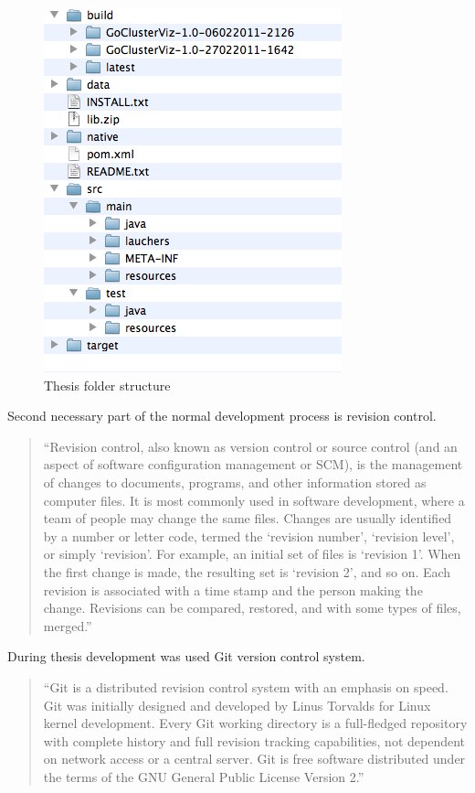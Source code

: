 \begin{figure}[h!]
\centering
\includegraphics[scale=0.6]{pictures/thesis_folder_structure.png}
\caption{Thesis folder structure}
\label{fig:THESIS_FOLDER_STRUCTURE}
\end{figure}

Second necessary part of the normal development process is revision control.

\begin{quotation}
``Revision control, also known as version control or source control (and an aspect of software configuration management or SCM),
is the management of changes to documents, programs, and other information stored as computer files.
It is most commonly used in software development, where a team of people may change the same files.
Changes are usually identified by a number or letter code, termed the `revision number', `revision level', or simply `revision'.
For example, an initial set of files is `revision 1'. When the first change is made, the resulting set is `revision 2', and so on.
Each revision is associated with a time stamp and the person making the change. Revisions can be compared,
restored, and with some types of files, merged.''~\cite{REVISION_CONTROL}
\end{quotation}

During thesis development was used Git version control system.

\begin{quotation}
``Git is a distributed revision control system with an emphasis on speed.
Git was initially designed and developed by Linus Torvalds for Linux kernel development.
Every Git working directory is a full-fledged repository with complete history and full revision tracking capabilities,
not dependent on network access or a central server. Git is free software distributed under the terms of the
GNU General Public License Version 2.''~\cite{GIT}
\end{quotation}

